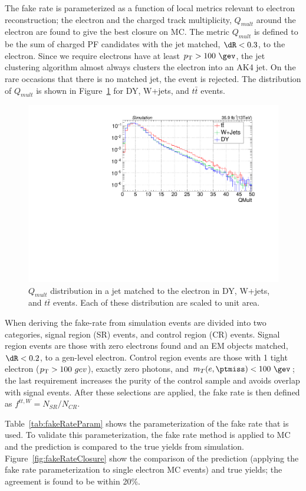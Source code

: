 The fake rate is parameterized as a function of local metrics relevant to electron reconstruction;
the electron \pt and the charged track multiplicity, $Q_{mult}$ around the electron 
are found to give the best closure on MC.  The metric $Q_{mult}$ 
is defined to be the sum of charged PF candidates with the jet 
matched, $\dR<0.3$, to the electron. Since we require electrons have at least
$\pt>100~\gev$, the jet clustering algorithm almost always clusters
the electron into an AK4 jet.  On the rare occasions that there is 
no matched jet, the event is rejected.  The distribution of $Q_{mult}$
is shown in Figure~\ref{fig:qMultDist} for DY, W+jets, and $t\bar{t}$ events. 

\begin{figure}[h!]
\centering
\includegraphics[width=0.48\linewidth]{../Figures/Chap3/fake_rate_closure/QMult_eleJet_ttwDY.pdf}
\caption[$Q_{mult}$ distribution for DY, W+jets, and $t\bar{t}$]{$Q_{mult}$ distribution in a jet matched to the electron in 
DY, W+jets, and $t\bar{t}$ events. Each of these distribution are scaled to unit area.}
\label{fig:qMultDist}
\end{figure}

When deriving the fake-rate from simulation events are divided into
two categories, signal region (SR) events, and control region (CR) events.  Signal region events are 
those with zero electrons found and an EM objects matched, $\dR<0.2$, to a gen-level
electron. Control region events are those with 1 tight electron ($p_{\mathrm{T}}>100~gev$), 
exactly zero photons, and $m_T(e,\ptmiss)<100~\gev$; the last requirement 
increases the purity of the control sample and avoids overlap with 
signal events.  After these selections are applied, the fake rate is then
defined as $f^{tt,W}=N_{SR}/N_{CR}$.  

Table~\ref{tab:fakeRateParam} shows the parameterization
of the fake rate that is used.   To validate this parameterization, the
fake rate method is applied to MC and the prediction is compared to the 
true yields from simulation.  Figure~\ref{fig:fakeRateClosure} show the comparison 
of the prediction (applying the fake rate parameterization to single 
electron MC events) and true yields; the agreement is found to be 
within 20\%.
                            

